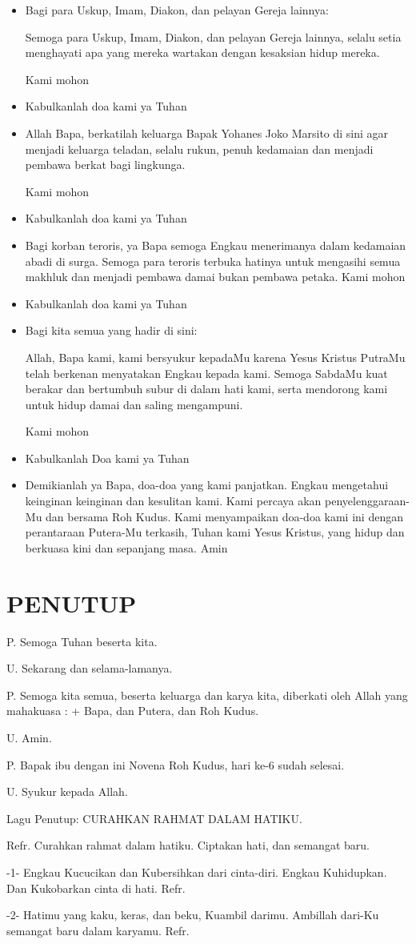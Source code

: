 \documentclass[12pt]{article}
\def\novena{6}
\newcommand{\BU}[1]{\begin{itemize} \item[U:] #1 \end{itemize}}
\newcommand{\BP}[1]{\begin{itemize} \item[P:] #1 \end{itemize}}
\begin{document}
\BP{Bagi para Uskup, Imam, Diakon, dan pelayan Gereja lainnya:
	
	Semoga para Uskup, Imam, Diakon, dan pelayan Gereja lainnya, selalu setia menghayati apa yang mereka wartakan dengan kesaksian hidup mereka.
	
	Kami mohon}

\BU{Kabulkanlah doa kami ya Tuhan}


\BP{Allah Bapa, berkatilah keluarga Bapak Yohanes Joko Marsito di sini agar menjadi keluarga teladan, selalu rukun, penuh kedamaian dan menjadi pembawa berkat bagi lingkunga.
	
	Kami mohon}

\BU{Kabulkanlah doa kami ya Tuhan}

\BP{Bagi korban teroris, ya Bapa semoga Engkau menerimanya dalam kedamaian abadi di surga. Semoga para teroris terbuka hatinya untuk mengasihi semua makhluk dan menjadi pembawa damai bukan pembawa petaka.
	Kami mohon}

\BU{Kabulkanlah doa kami ya Tuhan}

\BP{Bagi kita semua yang hadir di sini:
	
	Allah, Bapa kami, kami bersyukur kepadaMu karena Yesus Kristus PutraMu telah berkenan menyatakan Engkau kepada kami. Semoga SabdaMu kuat berakar dan bertumbuh subur di dalam hati kami, serta mendorong kami untuk hidup damai dan saling mengampuni.
	
	Kami mohon}

\BU{Kabulkanlah Doa kami ya Tuhan} 

\BP{Demikianlah ya Bapa, doa-doa yang kami panjatkan. Engkau mengetahui keinginan keinginan dan kesulitan kami. Kami percaya akan penyelenggaraan-Mu dan bersama Roh Kudus. Kami menyampaikan doa-doa kami ini dengan perantaraan Putera-Mu terkasih, Tuhan kami Yesus Kristus, yang hidup dan berkuasa kini dan sepanjang masa. Amin}



\section*{PENUTUP}

P. Semoga Tuhan beserta kita.

U. Sekarang dan selama-lamanya.

P. Semoga kita semua, beserta keluarga dan karya kita, diberkati oleh
Allah yang mahakuasa : + Bapa, dan Putera, dan Roh Kudus.

U. Amin.

P. Bapak ibu dengan ini Novena Roh Kudus, hari ke-\novena{} sudah selesai.

U. Syukur kepada Allah.

 Lagu Penutup:  CURAHKAN RAHMAT DALAM HATIKU.

Refr. Curahkan rahmat dalam hatiku. Ciptakan hati, dan semangat baru.

{}-1- Engkau Kucucikan dan Kubersihkan dari cinta-diri. Engkau
Kuhidupkan. Dan Kukobarkan cinta di hati. Refr. 

{}-2- Hatimu yang kaku, keras, dan beku, Kuambil darimu. Ambillah
dari-Ku semangat baru dalam karyamu. Refr.
\end{document}
